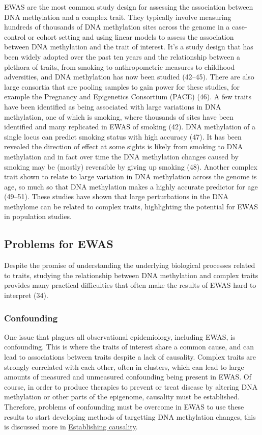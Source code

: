 \documentclass[11pt,twoside]{bristolthesis}
\begin{document}
EWAS are the most common study design for assessing the association between DNA methylation and a complex trait. They typically involve measuring hundreds of thousands of DNA methylation sites across the genome in a case-control or cohort setting and using linear models to assess the association between DNA methylation and the trait of interest. It's a study design that has been widely adopted over the past ten years and the relationship between a plethora of traits, from smoking to anthropometric measures to childhood adversities, and DNA methylation has now been studied (42--45). There are also large consortia that are pooling samples to gain power for these studies, for example the Pregnancy and Epigenetics Consortium (PACE) (46). A few traits have been identified as being associated with large variations in DNA methylation, one of which is smoking, where thousands of sites have been identified and many replicated in EWAS of smoking (42). DNA methylation of a single locus can predict smoking status with high accuracy (47). It has been revealed the direction of effect at some sights is likely from smoking to DNA methylation and in fact over time the DNA methylation changes caused by smoking may be (mostly) reversible by giving up smoking (48). Another complex trait shown to relate to large variation in DNA methylation across the genome is age, so much so that DNA methylation makes a highly accurate predictor for age (49--51). These studies have shown that large perturbations in the DNA methylome can be related to complex traits, highlighting the potential for EWAS in population studies.

\hypertarget{problems-for-ewas}{%
\subsection{Problems for EWAS}\label{problems-for-ewas}}

Despite the promise of understanding the underlying biological processes related to traits, studying the relationship between DNA methylation and complex traits provides many practical difficulties that often make the results of EWAS hard to interpret (34).

\hypertarget{confounding}{%
\subsubsection{Confounding}\label{confounding}}

One issue that plagues all observational epidemiology, including EWAS, is confounding. This is where the traits of interest share a common cause, and can lead to associations between traits despite a lack of causality. Complex traits are strongly correlated with each other, often in clusters, which can lead to large amounts of measured and unmeasured confounding being present in EWAS. Of course, in order to produce therapies to prevent or treat disease by altering DNA methylation or other parts of the epigenome, causality must be established. Therefore, problems of confounding must be overcome in EWAS to use these results to start developing methods of targetting DNA methylation changes, this is discussed more in \protect\hyperlink{establishing-causality}{Establishing causality}.
\end{document}
